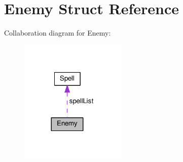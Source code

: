 \hypertarget{structEnemy}{}\section{Enemy Struct Reference}
\label{structEnemy}


Collaboration diagram for Enemy\+:
\nopagebreak
\begin{figure}[H]
\begin{center}
\leavevmode
\includegraphics[width=144pt]{structEnemy__coll__graph}
\end{center}
\end{figure}
